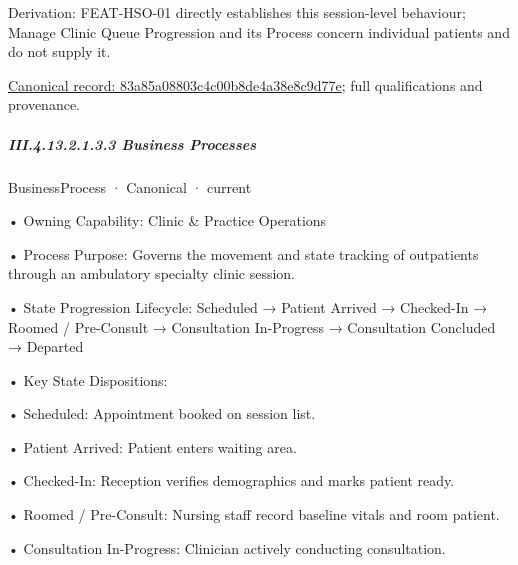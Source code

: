 Derivation: FEAT-HSO-01 directly establishes this session-level behaviour; Manage Clinic Queue Progression and its Process concern individual patients and do not supply it.


{\footnotesize \href{../../../../../../../../continuum/business/business-function/83a85a08803c4c00b8de4a38e8c9d77e.md}{Canonical record: 83a85a08803c4c00b8de4a38e8c9d77e}; full qualifications and provenance.}\par
\subparagraph*{III.4.13.2.1.3.3 Business Processes}
\label{navigation:III.4.13.2.1.3.3}

\label{navigation:III.4.13.2.1.3.3.1}

\label{element:319d6956276a4cdeb43e350e1b01d078}
{\small BusinessProcess · Canonical · current}\par

•
Owning Capability: Clinic \& Practice Operations



•
Process Purpose: Governs the movement and state tracking of outpatients through an ambulatory specialty clinic session.



•
State Progression Lifecycle: Scheduled → Patient Arrived → Checked-In → Roomed / Pre-Consult → Consultation In-Progress → Consultation Concluded → Departed



•
Key State Dispositions:



•
Scheduled: Appointment booked on session list.



•
Patient Arrived: Patient enters waiting area.



•
Checked-In: Reception verifies demographics and marks patient ready.



•
Roomed / Pre-Consult: Nursing staff record baseline vitals and room patient.



•
Consultation In-Progress: Clinician actively conducting consultation.



